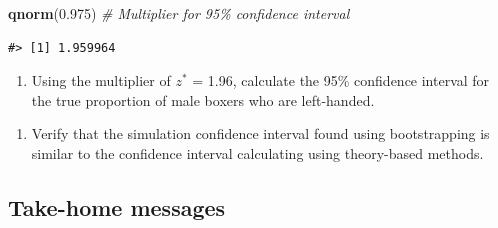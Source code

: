 \documentclass[
]{report}
\newenvironment{Shaded}{\begin{snugshade}}{\end{snugshade}}
\newcommand{\CommentTok}[1]{\textcolor[rgb]{0.56,0.35,0.01}{\textit{#1}}}
\newcommand{\FloatTok}[1]{\textcolor[rgb]{0.00,0.00,0.81}{#1}}
\newcommand{\KeywordTok}[1]{\textcolor[rgb]{0.13,0.29,0.53}{\textbf{#1}}}
\newcommand{\NormalTok}[1]{#1}
\providecommand{\tightlist}{%
  \setlength{\itemsep}{0pt}\setlength{\parskip}{0pt}}
\begin{document}
\begin{Shaded}
\begin{Highlighting}[]
\KeywordTok{qnorm}\NormalTok{(}\FloatTok{0.975}\NormalTok{) }\CommentTok{\# Multiplier for 95\% confidence interval}
\end{Highlighting}
\end{Shaded}

\begin{verbatim}
#> [1] 1.959964
\end{verbatim}

\begin{enumerate}
\def\labelenumi{\arabic{enumi}.}
\setcounter{enumi}{2}
\tightlist
\item
  Using the multiplier of \(z^*\) = 1.96, calculate the 95\% confidence interval for the true proportion of male boxers who are left-handed.
\end{enumerate}

\vspace{1in}

\begin{enumerate}
\def\labelenumi{\arabic{enumi}.}
\setcounter{enumi}{3}
\tightlist
\item
  Verify that the simulation confidence interval found using bootstrapping is similar to the confidence interval calculating using theory-based methods.
\end{enumerate}

\vspace{1in}

\hypertarget{take-home-messages-6}{%
\subsection{Take-home messages}\label{take-home-messages-6}}
\end{document}
